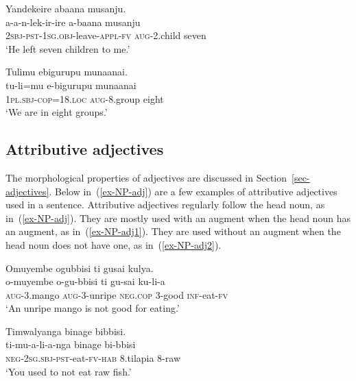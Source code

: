 \ea \label{ex-NP-num-high}
\begin{xlist}
	
\ex 	\label{ex-NP-num7}
	\glll	Yandekeire abaana musanju.\\
	a-a-n-lek-ir-ire				 a-baana 	musanju\\
	\textsc{2sbj}-\textsc{pst}-\textsc{1sg.obj}-leave-\textsc{appl}-\textsc{fv} 	\textsc{aug}-2.child 	seven\\
	\glt ‘He left seven children to me.’

\ex 	\label{ex-NP-num8}
	\glll  Tulimu ebigurupu munaanai.\\
	tu-li=mu e-bigurupu munaanai\\
 	1\textsc{pl.sbj}-\textsc{cop}=18.\textsc{loc} \textsc{aug}-8.group eight\\
\glt ‘We are in eight groups.’
\end{xlist}
\z


\subsection{Attributive adjectives} \label{sec-NP-adjective}

The morphological properties of adjectives are discussed in Section~\ref{sec-adjectives}. 
Below in~(\ref{ex-NP-adj}) are a few examples of attributive adjectives used in a sentence. 
Attributive adjectives regularly follow the head noun, as in~(\ref{ex-NP-adj}). 
They are mostly used with an augment when the head noun has an augment, as in~(\ref{ex-NP-adj1}). 
They are used without an augment when the head noun does not have one, as in~(\ref{ex-NP-adj2}).

\ea \label{ex-NP-adj}
\begin{xlist}
	
\ex 	\label{ex-NP-adj1}
	\glll	Omuyembe ogubbisi ti gusai kulya.\\
	o-muyembe o-gu-bbisi ti gu-sai ku-li-a\\
	\textsc{aug}-3.mango \textsc{aug}-3-unripe \textsc{neg}.\textsc{cop} 3-good \textsc{inf}-eat-\textsc{fv}\\
	\glt ‘An unripe mango is not good for eating.’

\ex 	\label{ex-NP-adj2}
	\glll  Timwalyanga		binage		bibbisi.\\
	ti-mu-a-li-a-nga		binage		bi-bbisi\\
		\textsc{neg}-2\textsc{sg.sbj}-\textsc{pst}-eat-\textsc{fv}-\textsc{hab}	8.tilapia	8-raw\\
\glt ‘You used to not eat raw fish.’

\end{xlist}
\z

